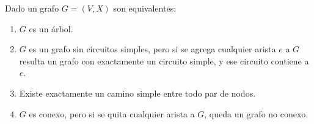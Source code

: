 \begin{teo}
    Dado un grafo $G = (V, X)$ son equivalentes:

    \begin{enumerate}
        \item $G$ es un árbol.
        \item $G$ es un grafo sin circuitos simples, pero si se agrega cualquier arista $e$ a $G$resulta un grafo con exactamente un circuito simple, y ese circuito contiene a $e$.
        \item Existe exactamente un camino simple entre todo par de nodos.
        \item $G$ es conexo, pero si se quita cualquier arista a $G$, queda un grafo no conexo.
    \end{enumerate}
\end{teo}

